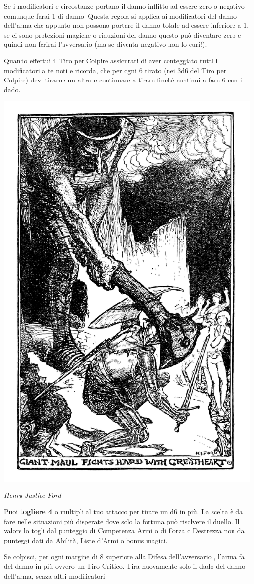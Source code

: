 \begin{multicols}{2}
Se i modificatori e circostanze portano il danno inflitto ad essere zero o negativo comunque farai 1 di danno.
Questa regola si applica ai modificatori del danno dell'arma che appunto non possono portare il danno totale ad essere inferiore a 1, se ci sono protezioni magiche o riduzioni del danno questo può diventare zero e quindi non ferirai l'avversario (ma se diventa negativo non lo curi!).

Quando effettui il Tiro per Colpire assicurati di aver conteggiato tutti i modificatori a te noti e ricorda, che per ogni 6 tirato (nei 3d6 del Tiro per Colpire) devi tirarne un altro e continuare a tirare finché continui a fare 6 con il dado.

\begin{center}
	\includegraphics[width=0.6\linewidth]{immagini/esplosionedanno.png}

	\emph{Henry Justice Ford}
\end{center}

Puoi \textbf{togliere 4} o multipli al tuo attacco per tirare un d6 in più. La scelta è da fare nelle situazioni più disperate dove solo la fortuna può risolvere il duello. Il valore lo togli dal punteggio di Competenza Armi o di Forza o Destrezza non da punteggi dati da Abilità, Liste d'Armi o bonus magici.

Se colpisci, per ogni margine di 8 superiore alla Difesa dell'avversario , l'arma fa del danno in più ovvero un Tiro Critico. Tira nuovamente solo il dado del danno dell'arma, senza altri modificatori.


\end{multicols}
